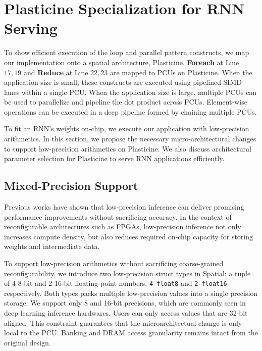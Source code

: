 \section{Plasticine Specialization for RNN Serving} \label{sec:rnn_arch}
To show efficient execution of the loop and parallel pattern constructs,
  we map our implementation onto a spatial architecture, Plasticine.
\textbf{Foreach} at Line $17, 19$ and \textbf{Reduce} at Line $22, 23$
  are mapped to PCUs on Plasticine.
When the application size is small,
  these constructs are executed using pipelined SIMD lanes within a single PCU.
When the application size is large,
  multiple PCUs can be used to parallelize and pipeline the dot
  product across PCUs. Element-wise operations can be executed in a deep pipeline
  formed by chaining multiple PCUs.

To fit an RNN's weights on-chip,
  we execute our application with low-precision arithmetics.
In this section,
  we propose the necessary micro-architectural changes to
  support low-precision arithmetics on Plasticine.
We also discuss architectural parameter selection for Plasticine
  to serve RNN applications efficiently.

\subsection{Mixed-Precision Support}
\label{sec:arch:varprec}
Previous works \cite{fowers2018configurable, jouppi2017datacenter}
  have shown that low-precision inference can deliver promising performance
  improvements without sacrificing accuracy.
In the context of reconfigurable architectures such as FPGAs,
  low-precision inference not only increases compute density,
  but also reduces required on-chip capacity for
  storing weights and intermediate data.

To support low-precision arithmetics without sacrificing coarse-grained reconfigurability,
we introduce two low-precision struct types in Spatial: a tuple of 4 8-bit and 2 16-bit floating-point 
numbers, \texttt{4-float8} and \texttt{2-float16} respectively.
Both types packs multiple low-precision values into a single precision storage.
We support only 8 and 16-bit precisions, which are commonly seen in deep learning inference hardwares.
Users can only access values that are 32-bit aligned.
This constraint guarantees that the microarchitectual change is only local to the PCU.
Banking and DRAM access granularity remains intact from the original design.

